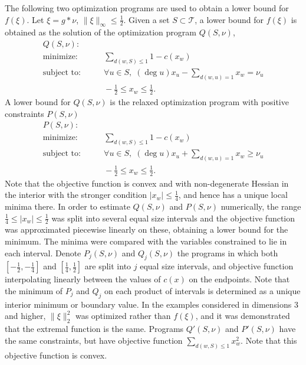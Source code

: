 \documentclass[a4paper, 12pt, notitlepage]{amsart}
\newcommand{\sT}{\mathscr{T}}
\theoremstyle{remark}
\begin{document}
The following two optimization programs are used to obtain a lower bound for $f(\xi)$. 
Let $\xi = g* \nu$, $\|\xi\|_\infty \leq \frac{1}{2}$.  Given a set $S \subset \sT$, a lower bound for $f(\xi)$ is obtained as the solution of the optimization program $Q(S, \nu)$,
\begin{align*}
 Q(S, \nu):&\\
 \text{minimize:}& \qquad \sum_{d(w, S) \leq 1} 1-c(x_w)\\
 \text{subject to:}& \qquad \forall u \in S,\; (\deg u) x_u - \sum_{d(w,u)=1} x_w = \nu_u\\
 & \qquad -\frac{1}{2} \leq x_w \leq \frac{1}{2}.
\end{align*}
A lower bound for $Q(S, \nu)$ is the relaxed optimization program with positive constraints $P(S, \nu)$
\begin{align*}
 P(S, \nu):&\\
 \text{minimize:}& \qquad \sum_{d(w, S) \leq 1} 1-c(x_w)\\
 \text{subject to:}& \qquad \forall u \in S,\; (\deg u) x_u + \sum_{d(w,u)=1} x_w \geq \nu_u\\
 & \qquad -\frac{1}{2} \leq x_w \leq \frac{1}{2}.
\end{align*}
Note that the objective function is convex and with non-degenerate Hessian in the interior with the stronger condition $|x_w|\leq \frac{1}{4}$, and hence has a unique local minima there.  In order to estimate $Q(S, \nu)$ and $P(S, \nu)$ numerically, the range $\frac{1}{4} \leq |x_w| \leq \frac{1}{2}$ was split into several equal size intervals and the objective function was approximated piecewise linearly on these, obtaining a lower bound for the minimum.  The minima were compared with the variables constrained to lie in each interval. Denote $P_j(S, \nu)$ and $Q_j(S, \nu)$ the programs in which both $\left[-\frac{1}{2}, -\frac{1}{4}\right]$ and $\left[\frac{1}{4}, \frac{1}{2}\right]$ are split into $j$ equal size intervals, and objective function interpolating linearly between the values of $c(x)$ on the endpoints.  Note that the minimum of $P_j$ and $Q_j$ on each product of intervals is determined as a unique interior minimum or boundary value.
In the examples considered in dimensions 3 and higher, $\|\xi\|_2^2$ was optimized rather than $f(\xi)$, and it was demonstrated that the extremal function is the same.  Programs $Q'(S, \nu)$ and $P'(S, \nu)$ have the same constraints, but have objective function
$\sum_{d(w, S) \leq 1} x_w^2.$  Note that this objective function is convex.
\end{document}
